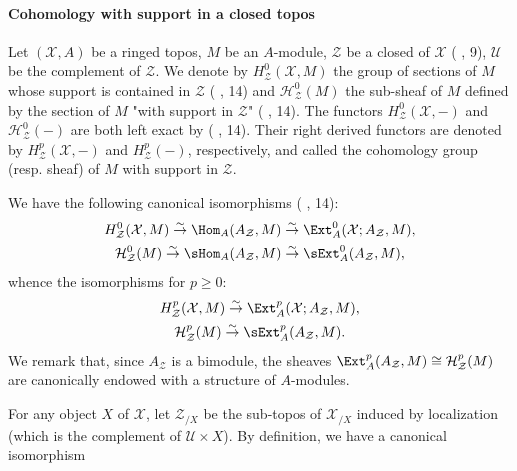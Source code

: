 \paragraph{Cohomology with support in a closed topos}
Let $(\mathcal{X},A)$ be a ringed topos, $M$ be an $A$-module, $\mathcal{Z}$ be a closed of $\mathcal{X}$ (\cite{SGA4-1} , 9), $\mathcal{U}$ be the complement of $\mathcal{Z}$. We denote by $H^0_\mathcal{Z}(\mathcal{X},M)$ the group of sections of $M$ whose support is contained in $\mathcal{Z}$ (\cite{SGA4-1} , 14) and $\mathcal{H}^0_\mathcal{Z}(M)$ the sub-sheaf of $M$ defined by the section of $M$ "with support in $\mathcal{Z}$" (\cite{SGA4-1} , 14). The functors $H^0_\mathcal{Z}(\mathcal{X},-)$ and $\mathcal{H}^0_\mathcal{Z}(-)$ are both left exact by (\cite{SGA4-1} , 14). Their right derived functors are denoted by $H^p_\mathcal{Z}(\mathcal{X},-)$ and $H_\mathcal{Z}^p(-)$, respectively, and called the cohomology group (resp. sheaf) of $M$ with support in $\mathcal{Z}$.\par
We have the following canonical isomorphisms (\cite{SGA4-1} , 14):
\begin{gather}
H^0_\mathcal{Z}(\mathcal{X},M) \stackrel{\sim}{\to } \Hom_A(A_\mathcal{Z},M) \stackrel{\sim}{\to } \Ext_A^0(\mathcal{X};A_\mathcal{Z},M),\label{ringed topos closed cohomology group isomorphism-1}\\
\mathcal{H}^0_\mathcal{Z}(M) \stackrel{\sim}{\to } \sHom_A(A_\mathcal{Z},M) \stackrel{\sim}{\to } \sExt_A^0(A_\mathcal{Z},M),\label{ringed topos closed cohomology sheaf isomorphism-1}
\end{gather}
whence the isomorphisms for $p\geq 0$:
\begin{gather}
H^p_\mathcal{Z}(\mathcal{X},M) \stackrel{\sim}{\to } \Ext_A^p(\mathcal{X};A_\mathcal{Z},M),\label{ringed topos closed cohomology group isomorphism-2}\\
\mathcal{H}^p_\mathcal{Z}(M) \stackrel{\sim}{\to } \sExt_A^p(A_\mathcal{Z},M).\label{ringed topos closed cohomology sheaf isomorphism-2}
\end{gather}
We remark that, since $A_\mathcal{Z}$ is a bimodule, the sheaves $\Ext_A^p(A_\mathcal{Z},M)\cong\mathcal{H}^p_\mathcal{Z}(M)$ are canonically endowed with a structure of $A$-modules.\par
For any object $X$ of $\mathcal{X}$, let $\mathcal{Z}_{/X}$ be the sub-topos of $\mathcal{X}_{/X}$ induced by localization (which is the complement of $\mathcal{U}\times X$). By definition, we have a canonical isomorphism
